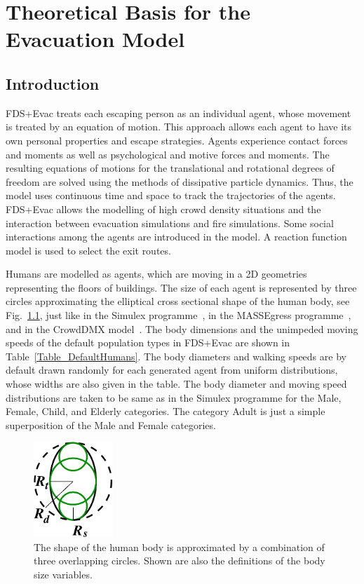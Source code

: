 \documentclass[12pt,a4paper,final,twoside]{stylevk}
\begin{document}
\clearpage

\newpage


\chapter{Theoretical Basis for the Evacuation
  Model}\label{Sec_BasisModel} 


\section{Introduction}

\noindent FDS+Evac treats each escaping person as an individual agent,
whose movement is treated by an equation of motion.  This approach
allows each agent to have its own personal properties and escape
strategies.  Agents experience contact forces and moments as well as
psychological and motive forces and moments.  The resulting equations
of motions for the translational and rotational degrees of freedom are
solved using the methods of dissipative particle dynamics.  Thus, the
model uses continuous time and space to track the trajectories of the
agents.  FDS+Evac allows the modelling of high crowd density
situations and the interaction between evacuation simulations and fire
simulations.  Some social interactions among the agents are introduced
in the model.  A reaction function model is used to select the exit
routes.


Humans are modelled as agents, which are moving in a 2D geometries
representing the floors of buildings.  The size of each agent is
represented by three circles approximating the elliptical cross
sectional shape of the human body, see Fig.~\ref{Fig_HumanBody},
just like in the Simulex programme~\cite{Simulex96, Thompson95a,
  Thompson95b, Thompson03}, in the MASSEgress programme~\cite{Pan06},
and in the CrowdDMX model~\cite{Langston06, Langston09}.  The body
dimensions and the unimpeded moving speeds of the default population
types in FDS+Evac are shown in Table~\ref{Table_DefaultHumans}.  The
body diameters and walking speeds are by default drawn randomly for
each generated agent from uniform distributions, whose widths are also
given in the table.  The body diameter and moving speed distributions
are taken to be same as in the Simulex programme for the Male, Female,
Child, and Elderly categories.  The category Adult is just a simple
superposition of the Male and Female categories.

%
\begin{figure}[tb]
  \centerline{\includegraphics[clip=true, width=30mm]{FIGURES/body_shape}} 
  \caption{The shape of the human body is approximated by a
    combination of three overlapping circles.  Shown are also the
    definitions of the body size variables.}\label{Fig_HumanBody}
\end{figure}
%
\end{document}
